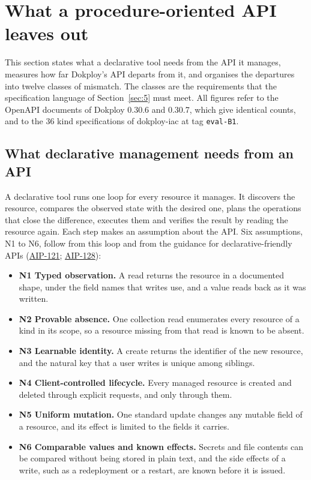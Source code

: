 \section{What a procedure-oriented API leaves out}\label{sec:3}

This section states what a declarative tool needs from the API it manages, measures how far Dokploy's
API departs from it, and organises the departures into twelve classes of mismatch. The classes are
the requirements that the specification language of Section~\ref{sec:5} must meet. All figures refer to the
OpenAPI documents of Dokploy 0.30.6 and 0.30.7, which give identical counts, and to the 36 kind
specifications of dokploy-iac at tag \texttt{eval-B1}.

\subsection{What declarative management needs from an API}\label{sec:3.1}

A declarative tool runs one loop for every resource it manages. It discovers the resource, compares
the observed state with the desired one, plans the operations that close the difference, executes them
and verifies the result by reading the resource again. Each step makes an assumption about the API.
Six assumptions, N1 to N6, follow from this loop and from the guidance for declarative-friendly APIs
(\href{https://google.aip.dev/121}{AIP-121}; \href{https://google.aip.dev/128}{AIP-128}):

\begin{itemize}
\item
  \textbf{N1 Typed observation.} A read returns the resource in a documented shape, under the field names
  that writes use, and a value reads back as it was written.
\item
  \textbf{N2 Provable absence.} One collection read enumerates every resource of a kind in its scope, so a
  resource missing from that read is known to be absent.
\item
  \textbf{N3 Learnable identity.} A create returns the identifier of the new resource, and the natural key
  that a user writes is unique among siblings.
\item
  \textbf{N4 Client-controlled lifecycle.} Every managed resource is created and deleted through explicit
  requests, and only through them.
\item
  \textbf{N5 Uniform mutation.} One standard update changes any mutable field of a resource, and its effect
  is limited to the fields it carries.
\item
  \textbf{N6 Comparable values and known effects.} Secrets and file contents can be compared without being
  stored in plain text, and the side effects of a write, such as a redeployment or a restart, are known
  before it is issued.
\end{itemize}

